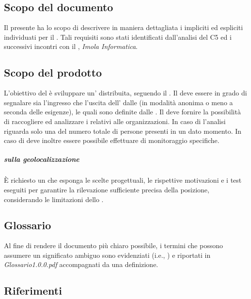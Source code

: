 \subsection{Scopo del documento}
\label{sub:scopo_del_documento}
Il presente  ha lo scopo di descrivere in maniera dettagliata i  impliciti ed espliciti individuati per il . Tali requisiti sono stati identificati dall'analisi del  C5 ed i successivi incontri con il , \textit{Imola Informatica}.
\subsection{Scopo del prodotto}
\label{sub:scopo_del_prodotto}
L'obiettivo del  è sviluppare un' distribuita, seguendo il . Il  deve essere in grado di segnalare sia l'ingresso che l'uscita dell' dalle  (in modalità anonima o meno a seconda delle esigenze), le quali sono definite dalle . Il  deve fornire la possibilità di raccogliere ed analizzare i  relativi alle organizzazioni. In caso di  l'analisi riguarda solo una  del numero totale di persone presenti in un dato momento. In caso di  deve inoltre essere possibile effettuare  di monitoraggio specifiche.
\subparagraph{ sulla geolocalizzazione}
\label{subp:errore_sulla_geolocalizzazione}
È richiesto un  che esponga le scelte progettuali, le rispettive motivazioni e i test eseguiti per garantire la rilevazione sufficiente precisa della posizione, considerando le limitazioni dello .
\subsection{Glossario}
\label{sub:glossario}
Al fine di rendere il documento più chiaro possibile, i termini che possono assumere un significato ambiguo sono evidenziati (i.e., ) e riportati in \textit{Glossario1.0.0.pdf} accompagnati da una definizione.
\subsection{Riferimenti}
\label{sub:riferimenti}
